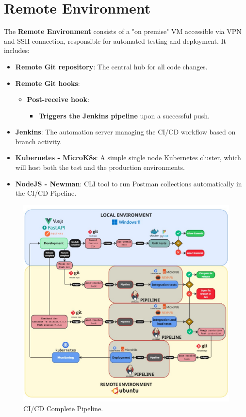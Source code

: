 \section{Remote Environment}

The \textbf{Remote Environment} consists of a "on premise" VM accessible via VPN and SSH connection, responsible for automated testing and deployment. It includes:

\begin{itemize}
    \item \textbf{Remote Git repository}: The central hub for all code changes.
    \item \textbf{Remote Git hooks}:
    \begin{itemize}
        \item \textbf{Post-receive hook}:
        \begin{itemize}
            \item \textbf{Triggers the Jenkins pipeline} upon a successful push.
        \end{itemize}
    \end{itemize}
    \item \textbf{Jenkins}: The automation server managing the CI/CD workflow based on branch activity.
    \item \textbf{Kubernetes - MicroK8s}: A simple single node Kubernetes cluster, which will host both the test and the production environments.
    \item \textbf{NodeJS - Newman}: CLI tool to run Postman collections automatically in the CI/CD Pipeline.
\end{itemize}

\begin{figure}[h]
    \centering
    \includegraphics[width=1\linewidth]{Devops/imgs/DEVOPS.pdf}
    \caption{CI/CD Complete Pipeline.}
    \label{fig:pipeline}
\end{figure}

